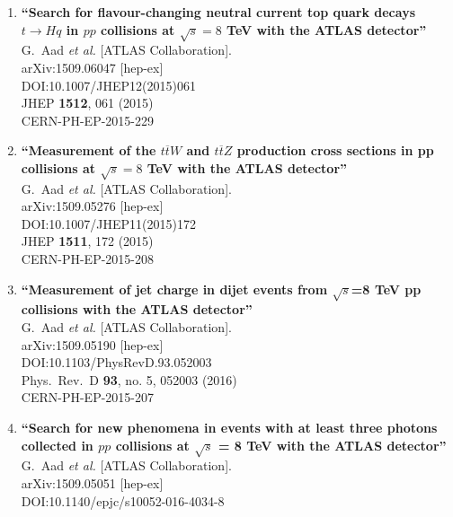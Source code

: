 \documentclass{article}
\begin{document}
\begin{enumerate}
\item%
{\bf ``Search for flavour-changing neutral current top quark decays $t\to Hq$ in $pp$ collisions at $\sqrt{s}=8$ TeV with the ATLAS detector''}
  \\{}G.~Aad {\it et al.} [ATLAS Collaboration].
  \\{}arXiv:1509.06047 [hep-ex]
  \\{}DOI:10.1007/JHEP12(2015)061
  \\{}JHEP {\bf 1512}, 061 (2015)
  \\{}CERN-PH-EP-2015-229
\item%
{\bf ``Measurement of the $ t\overline{t}W $ and $ t\overline{t}Z $ production cross sections in pp collisions at $ \sqrt{s}=8 $ TeV with the ATLAS detector''}
  \\{}G.~Aad {\it et al.} [ATLAS Collaboration].
  \\{}arXiv:1509.05276 [hep-ex]
  \\{}DOI:10.1007/JHEP11(2015)172
  \\{}JHEP {\bf 1511}, 172 (2015)
  \\{}CERN-PH-EP-2015-208
\item%
{\bf ``Measurement of jet charge in dijet events from $\sqrt{s}$=8  TeV pp collisions with the ATLAS detector''}
  \\{}G.~Aad {\it et al.} [ATLAS Collaboration].
  \\{}arXiv:1509.05190 [hep-ex]
  \\{}DOI:10.1103/PhysRevD.93.052003
  \\{}Phys.\ Rev.\ D {\bf 93}, no. 5, 052003 (2016)
  \\{}CERN-PH-EP-2015-207
\item%
{\bf ``Search for new phenomena in events with at least three photons collected in $pp$ collisions at $\sqrt{s}$ = 8 TeV with the ATLAS detector''}
  \\{}G.~Aad {\it et al.} [ATLAS Collaboration].
  \\{}arXiv:1509.05051 [hep-ex]
  \\{}DOI:10.1140/epjc/s10052-016-4034-8

\end{enumerate}
\end{document}
